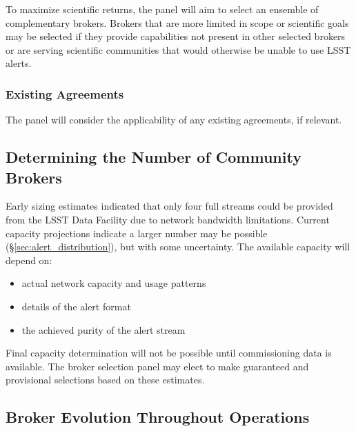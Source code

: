 To maximize scientific returns, the panel will aim to select an ensemble of complementary brokers.
Brokers that are more limited in scope or scientific goals may be selected if they provide capabilities not present in other selected brokers or are serving scientific communities that would otherwise be unable to use LSST alerts.

\subsubsection{Existing Agreements}

The panel will consider the applicability of any existing agreements, if relevant.

\subsection{Determining the Number of Community Brokers} \label{sec:numbrokers}

Early sizing estimates indicated that only four full streams could be provided from the LSST Data Facility due to network bandwidth limitations.
Current capacity projections indicate a larger number may be possible (\S \ref{sec:alert_distribution}), but with some uncertainty.
The available capacity will depend on:

\begin{itemize}
	\item actual network capacity and usage patterns
	\item details of the alert format
	\item the achieved purity of the alert stream
\end{itemize}

Final capacity determination will not be possible until commissioning data is available.
The broker selection panel may elect to make guaranteed and provisional selections based on these estimates.


\subsection{Broker Evolution Throughout Operations}

